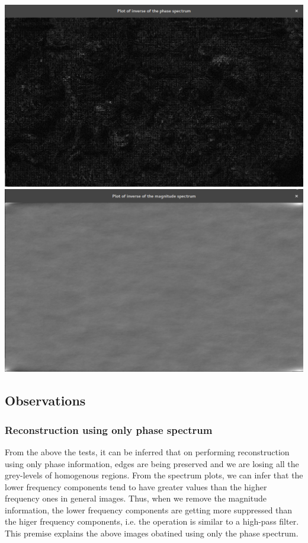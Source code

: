 \documentclass[a4paper,fleqn,11pt]{article}
\theoremstyle{mytheor}
\begin{document}
\begin{center}
\includegraphics[scale= 0.29]{../results/low_phase.png}
\includegraphics[scale= 0.29]{../results/low_magnitude.png}
\end{center}
\subsection*{Observations}
\subsubsection*{Reconstruction using only phase spectrum}
From the above the tests, it can be inferred that on performing reconstruction using only phase information, edges are being preserved and we are losing all the grey-levels of homogenous regions. From the spectrum plots, we can infer that the lower frequency components tend to have greater values than the higher frequency ones in general images. Thus, when we remove the magnitude information, the lower frequency components are getting more suppressed than the higer frequency components, i.e. the operation is similar to a high-pass filter. This premise explains the above images obatined using only the phase spectrum.
\end{document}

